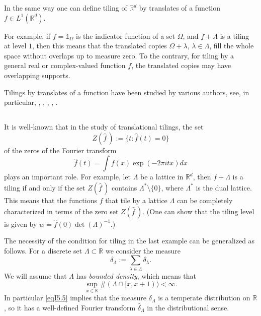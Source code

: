\documentclass[reqno,a4paper,12pt]{amsart}
\numberwithin{equation}{section}
\numberwithin{figure}{section}
\newcommand\R{\mathbb{R}}
\newcommand\lam{\lambda}
\newcommand\Lam{\Lambda}
\newcommand\1{\mathds{1}}
\newcommand\sbt{\subset}
\renewcommand\hat{\widehat}
\newcommand{\ft}[1]{\widehat{#1}}
\newcommand{\zfft}{Z(\ft{f}\,)}
\theoremstyle{plain}
\theoremstyle{definition}
\begin{document}
In the same way one can define tiling of $\R^d$
by translates of a function $f \in L^1(\R^d)$.

For example, if $f = \1_\Omega$ 
is the indicator function of a set $\Omega$,
and $f + \Lam$ is a tiling at level $1$, then this means
that the translated copies $\Omega+\lam$, $\lam\in\Lam$,
fill the whole space without overlaps up to measure zero. 
To the contrary, for tiling by a
 general real or complex-valued function
$f$, the translated copies may have 
overlapping supports.


Tilings by translates of a function 
have been studied by various authors, see, in particular, \cite{LM91}, 
\cite{KL96}, \cite{Kol04}, \cite{KL16}, \cite{Liu18}.

\subsection{}
It is well-known that in the study of translational
tilings, the set 
\begin{equation}
\label{eqI5.1}
 \zfft := \{ t  : \ft{f}(t) = 0\}
\end{equation}
of the zeros of the Fourier transform
\begin{equation}
\label{eqI5.2}
\ft{f}(t)=\int f(x) \exp(-2 \pi i tx) dx
\end{equation}
plays an important role.  For example, 
let $\Lam$ be  a lattice in $\R^d$,
then $f + \Lam$ is a tiling 
if and only if the set $\zfft$
contains $\Lam^* \setminus \{0\}$, where $\Lam^*$ is
the dual lattice. This means that the functions $f$ that tile
by a lattice $\Lam$ can be  completely characterized
in terms of the zero set $\zfft$.
(One can show that  the tiling 
level is given by $w = \ft{f}(0) \det(\Lam)^{-1}$.)

The  necessity of the condition for tiling 
in the last example can be generalized as follows.
For a discrete set $\Lambda \sbt \mathbb{R}$
 we consider the measure
\begin{equation}
\label{eqI5.4}
\delta_\Lambda:=\sum_{\lambda\in\Lambda}\delta_\lambda.
\end{equation}
We will assume that $\Lambda$ has \emph{bounded density}, which means that
 \begin{equation}
\label{eqI5.5}
 \sup_{x\in\mathbb R} \#(\Lambda\cap[x,x+1))<\infty.
 \end{equation}
In particular \eqref{eqI5.5} implies that the measure $\delta_\Lambda$ is a temperate distribution on $\mathbb R$, so it has
a well-defined Fourier transform 
 $\hat\delta_\Lambda$
  in the distributional sense.
\end{document}
